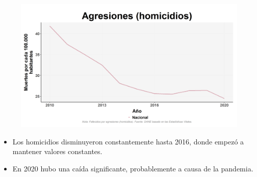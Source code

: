     \begin{figure}[H]
        \caption[Agresiones (homicidios) a nivel nacional ]{\label{homicid_nal_trend} }
        \begin{center}
        \includegraphics[width=\textwidth,keepaspectratio]{img/var_289_trend.png}
        \end{center}
    \end{figure}
            \begin{itemize}
                \item Los homicidios disminuyeron constantemente hasta 2016, donde empezó a mantener valores constantes.
                \item En 2020 hubo una caída significante, probablemente a causa de la pandemia.
                \end{itemize}

